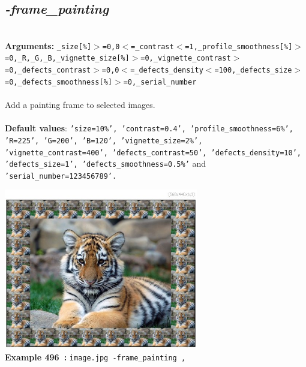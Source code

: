 \documentclass[a4paper,11pt,twoside]{book}
\begin{document}
\subsection{\emph{-frame\_painting} }\vspace*{-0.5em}
~\\\textbf{Arguments: } 
{\small \texttt{\_size[\%]$>$=0,0$<$=\_contrast$<$=1,\_profile\_smoothness[\%]$>$=0,\_R,\_G,\_B,\_vignette\_size[\%]$>$=0,\_vignette\_contrast$>$=0,\_defects\_contrast$>$=0,0$<$=\_defects\_density$<$=100,\_defects\_size$>$=0,\_defects\_smoothness[\%]$>$=0,\_serial\_number}}\\~\\
Add a painting frame to selected images.
~\\~\\\textbf{Default values}: {\small \texttt{'size=10\%', 'contrast=0.4', 'profile\_smoothness=6\%', 'R=225', 'G=200', 'B=120', 'vignette\_size=2\%', 'vignette\_contrast=400', 'defects\_contrast=50', 'defects\_density=10', 'defects\_size=1', 'defects\_smoothness=0.5\%'} and \texttt{'serial\_number=123456789'.}}
\begin{center}\includegraphics[keepaspectratio=true,height=7cm,width=\textwidth]{img/gmic_def496.jpg}\\
{\footnotesize \textbf{Example 496~:} \texttt{image.jpg -frame\_painting ,}}
\end{center}
\end{document}
